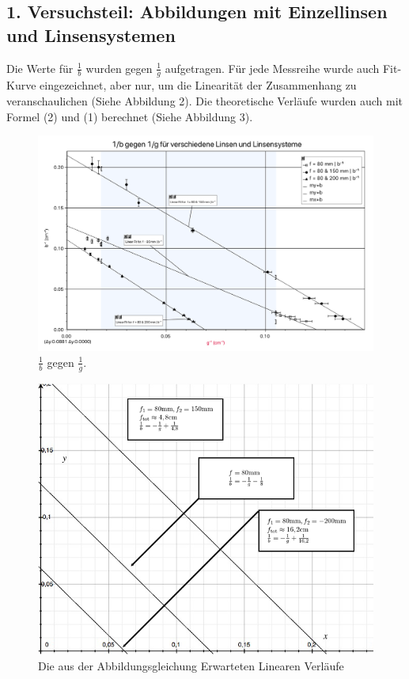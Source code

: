 \documentclass[11pt,a4paper]{article}
\begin{document}
\subsection{1. Versuchsteil: Abbildungen mit Einzellinsen und Linsensystemen}
Die Werte für $\frac{1}{b}$ wurden gegen $\frac{1}{g}$ aufgetragen. Für jede Messreihe wurde auch Fit-Kurve eingezeichnet, aber nur, um die Linearität der Zusammenhang zu veranschaulichen (Siehe Abbildung 2). Die theoretische Verläufe wurden auch mit Formel (2) und (1) berechnet (Siehe Abbildung 3). 
\begin{figure}
	\centering
	\includegraphics[width=\linewidth]{Abb2}
	\caption{$\frac{1}{b}$ gegen $\frac{1}{g}$.}
\end{figure} 

\begin{figure}
	\centering
	\includegraphics[scale=0.5]{Abb3}
	\caption{ Die aus der Abbildungsgleichung Erwarteten Linearen Verläufe}
\end{figure} 
\end{document}
